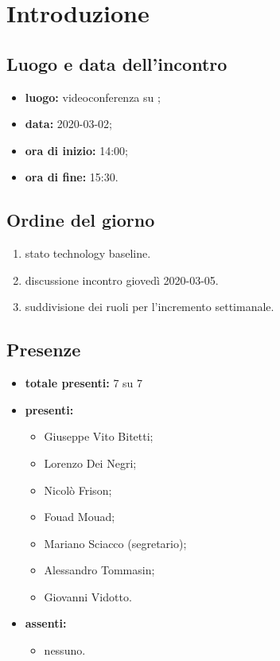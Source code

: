 \section*{Introduzione}

\subsection*{Luogo e data dell'incontro}
	\begin{itemize}
		\item \textbf{luogo:} videoconferenza su ;
		\item \textbf{data:} 2020-03-02;
		\item \textbf{ora di inizio:} 14:00;
		\item \textbf{ora di fine:} 15:30.
	\end{itemize}

\subsection*{Ordine del giorno}
	\begin{enumerate}
			\item stato technology baseline.
			\item discussione incontro giovedì 2020-03-05.
			\item suddivisione dei ruoli per l'incremento settimanale.
	\end{enumerate}

\subsection*{Presenze}
	\begin{itemize}
		\item \textbf{totale presenti:} 7 su 7
		\item \textbf{presenti: }
			\begin{itemize}			
				\item Giuseppe Vito Bitetti;
				\item Lorenzo Dei Negri;
				\item Nicolò Frison;
				\item Fouad Mouad;
				\item Mariano Sciacco (segretario);
				\item Alessandro Tommasin;
				\item Giovanni Vidotto.
			\end{itemize}
		\item \textbf{assenti: } 
			\begin{itemize}
				\item nessuno.
			\end{itemize}
	\end{itemize}


